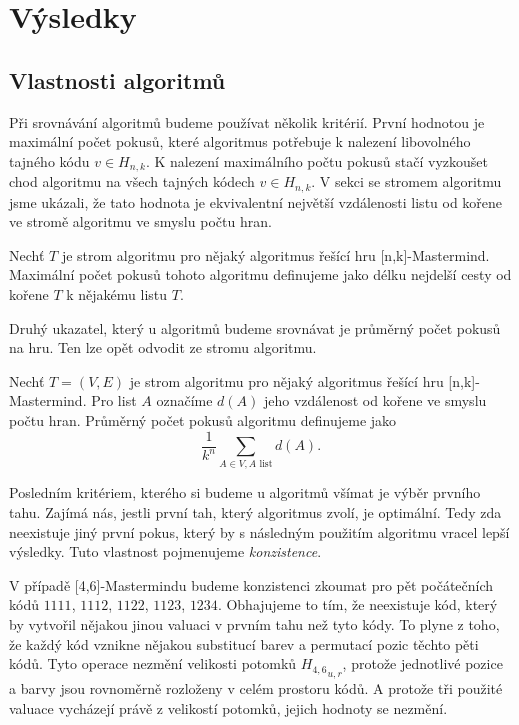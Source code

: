 \chapter{Výsledky}

\section{Vlastnosti algoritmů}
Při srovnávání algoritmů budeme používat několik kritérií. První hodnotou je maximální počet pokusů, které algoritmus potřebuje k nalezení libovolného tajného kódu $v \in H_{n,k}$. K nalezení maximálního počtu pokusů stačí vyzkoušet chod algoritmu na všech tajných kódech $v \in H_{n,k}$. V sekci se stromem algoritmu jsme ukázali, že tato hodnota je ekvivalentní největší vzdálenosti listu od kořene ve stromě algoritmu ve smyslu počtu hran.

\begin{definice}\label{defmaxpocetpokusu}
    Nechť $T$ je strom algoritmu pro nějaký algoritmus řešící hru [n,k]-Mastermind. Maximální počet pokusů tohoto algoritmu definujeme jako délku nejdelší cesty od kořene $T$ k nějakému listu $T$. 
\end{definice}

Druhý ukazatel, který u algoritmů budeme srovnávat je průměrný počet pokusů na hru. Ten lze opět odvodit ze stromu algoritmu.

\begin{definice}\label{defprumpocetpokusu}
    Nechť $T = (V,E)$ je strom algoritmu pro nějaký algoritmus řešící hru [n,k]-Mastermind. Pro list $A$ označíme $d(A)$ jeho vzdálenost od kořene ve smyslu počtu hran. Průměrný počet pokusů algoritmu definujeme jako 
    \[\frac{1}{k^n}\sum_{A\in V, A \text{ list}} d(A).\]
\end{definice}

Posledním kritériem, kterého si budeme u algoritmů všímat je výběr prvního tahu. Zajímá nás, jestli první tah, který algoritmus zvolí, je optimální. Tedy zda neexistuje jiný první pokus, který by s následným použitím algoritmu vracel lepší výsledky. Tuto vlastnost pojmenujeme \emph{konzistence}.

V případě [4,6]-Mastermindu budeme konzistenci zkoumat pro pět počátečních kódů $1111$, $1112$, $1122$, $1123$, $1234$. Obhajujeme to tím, že neexistuje kód, který by vytvořil nějakou jinou valuaci v prvním tahu než tyto kódy. To plyne z toho, že každý kód vznikne nějakou substitucí barev a permutací pozic těchto pěti kódů. Tyto operace nezmění velikosti potomků ${H_{4,6}}_{u,r}$, protože jednotlivé pozice a barvy jsou rovnoměrně rozloženy v celém prostoru kódů. A protože tři použité valuace vycházejí právě z velikostí potomků, jejich hodnoty se nezmění. 

